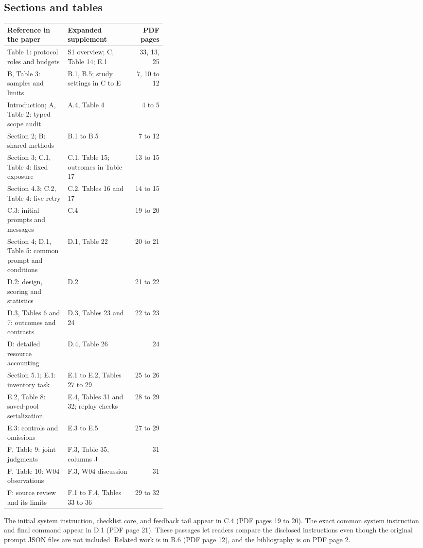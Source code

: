 \documentclass[11pt]{article}
\begin{document}
\subsection*{Sections and tables}
{\small
\begin{tabularx}{\linewidth}{@{}p{0.38\linewidth}Xr@{}}
\toprule
Reference in the paper & Expanded supplement & PDF pages\\
\midrule
Table 1: protocol roles and budgets & S1 overview; C, Table 14; E.1 & 33, 13, 25\\
B, Table 3: samples and limits & B.1, B.5; study settings in C to E & 7, 10 to 12\\
Introduction; A, Table 2: typed scope audit & A.4, Table 4 & 4 to 5\\
Section 2; B: shared methods & B.1 to B.5 & 7 to 12\\
Section 3; C.1, Table 4: fixed exposure & C.1, Table 15; outcomes in Table 17 & 13 to 15\\
Section 4.3; C.2, Table 4: live retry & C.2, Tables 16 and 17 & 14 to 15\\
C.3: initial prompts and messages & C.4 & 19 to 20\\
Section 4; D.1, Table 5: common prompt and conditions & D.1, Table 22 & 20 to 21\\
D.2: design, scoring and statistics & D.2 & 21 to 22\\
D.3, Tables 6 and 7: outcomes and contrasts & D.3, Tables 23 and 24 & 22 to 23\\
D: detailed resource accounting & D.4, Table 26 & 24\\
Section 5.1; E.1: inventory task & E.1 to E.2, Tables 27 to 29 & 25 to 26\\
E.2, Table 8: saved-pool serialization & E.4, Tables 31 and 32; replay checks & 28 to 29\\
E.3: controls and omissions & E.3 to E.5 & 27 to 29\\
F, Table 9: joint judgments & F.3, Table 35, columns J & 31\\
F, Table 10: W04 observations & F.3, W04 discussion & 31\\
F: source review and its limits & F.1 to F.4, Tables 33 to 36 & 29 to 32\\
\bottomrule
\end{tabularx}
}

The initial system instruction, checklist core, and feedback tail appear in C.4
(PDF pages 19 to 20). The exact common system instruction and final command
appear in D.1 (PDF page 21). These passages let readers compare the disclosed
instructions even though the original prompt JSON files are not included.
Related work is in B.6 (PDF page 12), and the bibliography is on PDF page 2.
\end{document}
